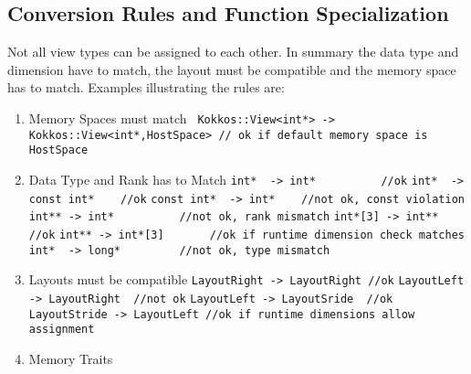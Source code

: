 \subsection{Conversion Rules and Function Specialization}

Not all view types can be assigned to each other. In summary
the data type and dimension have to match, the layout must be
compatible and the memory space has to match. Examples illustrating
the rules are:

\begin{enumerate}
\item Memory Spaces must match
\subitem \lstinline{ Kokkos::View<int*> -> Kokkos::View<int*,HostSpace> // ok if default memory space is HostSpace}
\item Data Type and Rank has to Match
\subitem \lstinline{int*  -> int*          //ok}
\subitem \lstinline{int*  -> const int*    //ok}
\subitem \lstinline{const int*  -> int*    //not ok, const violation}
\subitem \lstinline{int** -> int*          //not ok, rank mismatch}
\subitem \lstinline{int*[3] -> int**       //ok}
\subitem \lstinline{int** -> int*[3]       //ok if runtime dimension check matches}
\subitem \lstinline{int*  -> long*         //not ok, type mismatch}
\item Layouts must be compatible
\subitem \lstinline{LayoutRight -> LayoutRight //ok}
\subitem \lstinline{LayoutLeft -> LayoutRight  //not ok}
\subitem \lstinline{LayoutLeft -> LayoutSride  //ok}
\subitem \lstinline{LayoutStride -> LayoutLeft //ok if runtime dimensions allow assignment}
\item Memory Traits 
\end{enumerate}


